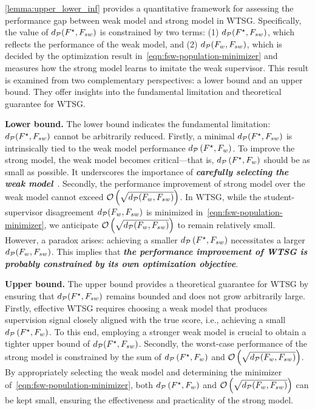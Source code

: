 \cref{lemma:upper_lower_inf} provides a quantitative framework for assessing the performance gap between weak model and strong model in WTSG.
Specifically, the value of $d_\mathcal{P}(F^\star, F_{sw})$ is constrained by two terms: 
(1) $d_\mathcal{P}(F^\star, F_{sw})$, which reflects the performance of the weak model, and 
(2) $d_\mathcal{P}(F_w, F_{sw})$, which is decided by the optimization result in~\cref{eqn:fsw-population-minimizer} and measures how the strong model learns to imitate the weak supervisor.
This result is examined from two complementary perspectives: a lower bound and an upper bound.
They offer insights into the fundamental limitation and theoretical guarantee for WTSG. 

\noindent \textbf{Lower bound.}
The lower bound indicates the fundamental limitation: $d_\mathcal{P}(F^\star, F_{sw})$ cannot be arbitrarily reduced.
Firstly, a minimal $d_\mathcal{P}(F^\star, F_{sw})$ is intrinsically tied to the weak model performance $d_\mathcal{P}\left( F^\star, F_w \right)$.
To improve the strong model, the weak model becomes critical---that is, $d_\mathcal{P}\left( F^\star, F_w \right)$ should be as small as possible. It underscores the importance of \textbf{\textit{carefully selecting the weak model}}~\citep{burns2023weak,yang2024super}.
Secondly, the performance improvement of strong model over the weak model cannot exceed $\mathcal{O} \left(\sqrt{d_\mathcal{P}(F_w, F_{sw})} \right)$.
In WTSG, while the student-supervisor disagreement $d_\mathcal{P}(F_w, F_{sw})$ is minimized in~\cref{eqn:fsw-population-minimizer}, we anticipate $\mathcal{O} \left(\sqrt{d_\mathcal{P}(F_w, F_{sw})} \right)$ to remain relatively small.
However, a paradox arises: achieving a smaller $d_\mathcal{P}\left( F^\star, F_{sw} \right)$ necessitates a larger $d_\mathcal{P}(F_w, F_{sw})$.
This implies that \textbf{\textit{the performance improvement of WTSG is probably constrained by its own optimization objective}}.





\noindent \textbf{Upper bound.}
The upper bound provides a theoretical guarantee for WTSG by ensuring that $d_\mathcal{P}(F^\star, F_{sw})$ remains bounded and does not grow arbitrarily large.
Firstly, effective WTSG requires choosing a weak model that produces supervision signal closely aligned with the true score, i.e., achieving a small $d_\mathcal{P}\left( F^\star, F_w\right)$. 
To this end, employing a stronger weak model is crucial to obtain a tighter upper bound of $d_\mathcal{P}(F^\star, F_{sw})$.
Secondly, the worst-case performance of the strong model is constrained by the sum of $d_\mathcal{P}\left( F^\star, F_w\right)$ and $\mathcal{O} \left(\sqrt{d_\mathcal{P}(F_w, F_{sw})} \right)$.
By appropriately selecting the weak model and determining the minimizer of~\cref{eqn:fsw-population-minimizer}, both $d_\mathcal{P}\left( F^\star, F_w\right)$ and $\mathcal{O} \left(\sqrt{d_\mathcal{P}(F_w, F_{sw})} \right)$ can be kept small, ensuring the effectiveness and practicality of the strong model.
















